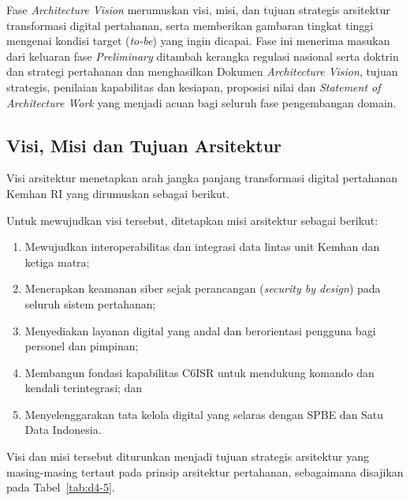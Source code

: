 Fase \textit{Architecture Vision} merumuskan visi, misi, dan tujuan strategis arsitektur transformasi digital pertahanan, serta memberikan gambaran tingkat tinggi mengenai kondisi target (\textit{to-be}) yang ingin dicapai. Fase ini menerima masukan dari keluaran fase \textit{Preliminary} ditambah kerangka regulasi nasional serta doktrin dan strategi pertahanan dan menghasilkan Dokumen \textit{Architecture Vision}, tujuan strategis, penilaian kapabilitas dan kesiapan, proposisi nilai dan \textit{Statement of Architecture Work} yang menjadi acuan bagi seluruh fase pengembangan domain.

\subsection{Visi, Misi dan Tujuan Arsitektur}

Visi arsitektur menetapkan arah jangka panjang transformasi digital pertahanan Kemhan RI yang dirumuskan sebagai berikut.

\begin{center}
\end{center}

Untuk mewujudkan visi tersebut, ditetapkan misi arsitektur sebagai berikut:

\begin{enumerate}
  \item Mewujudkan interoperabilitas dan integrasi data lintas unit Kemhan dan ketiga matra;
  \item Menerapkan keamanan siber sejak perancangan (\textit{security by design}) pada seluruh sistem pertahanan;
  \item Menyediakan layanan digital yang andal dan berorientasi pengguna bagi personel dan pimpinan;
  \item Membangun fondasi kapabilitas C6ISR untuk mendukung komando dan kendali terintegrasi; dan
  \item Menyelenggarakan tata kelola digital yang selaras dengan SPBE dan Satu Data Indonesia.
\end{enumerate}

Visi dan misi tersebut diturunkan menjadi tujuan strategis arsitektur yang masing-masing tertaut pada prinsip arsitektur pertahanan, sebagaimana disajikan pada Tabel~\ref{tab:d4-5}.

